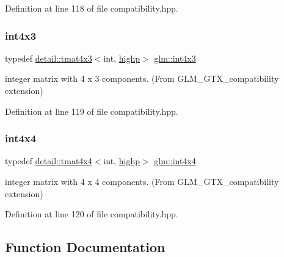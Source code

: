 Definition at line 118 of file compatibility.\+hpp.

\mbox{\label{group__gtx__compatibility_gaa80ec1b785920a08d366b3c09859d888}} 
\subsubsection{\texorpdfstring{int4x3}{int4x3}}
{\footnotesize\ttfamily typedef \hyperlink{structglm_1_1detail_1_1tmat4x3}{detail\+::tmat4x3}$<$int, \hyperlink{namespaceglm_a0f04f086094c747d227af4425893f545ac6f7eab42eacbb10d59a58e95e362074}{highp}$>$ \hyperlink{group__gtx__compatibility_gaa80ec1b785920a08d366b3c09859d888}{glm\+::int4x3}}



integer matrix with 4 x 3 components. (From G\+L\+M\+\_\+\+G\+T\+X\+\_\+compatibility extension) 



Definition at line 119 of file compatibility.\+hpp.

\mbox{\label{group__gtx__compatibility_ga5f8072c2dce67ad49939e12b168d1de1}} 
\subsubsection{\texorpdfstring{int4x4}{int4x4}}
{\footnotesize\ttfamily typedef \hyperlink{structglm_1_1detail_1_1tmat4x4}{detail\+::tmat4x4}$<$int, \hyperlink{namespaceglm_a0f04f086094c747d227af4425893f545ac6f7eab42eacbb10d59a58e95e362074}{highp}$>$ \hyperlink{group__gtx__compatibility_ga5f8072c2dce67ad49939e12b168d1de1}{glm\+::int4x4}}



integer matrix with 4 x 4 components. (From G\+L\+M\+\_\+\+G\+T\+X\+\_\+compatibility extension) 



Definition at line 120 of file compatibility.\+hpp.



\subsection{Function Documentation}
\mbox{\label{group__gtx__compatibility_gac63011205bf6d0be82589dc56dd26708}} 
